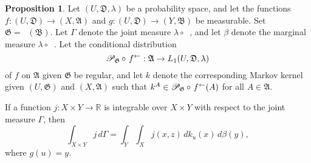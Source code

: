 \documentclass[
twoside=true,
paper=letter,
fontsize=9pt,
pagesize=auto,
leqno,
openany,
headsepline,
overfullrule,
]{scrbook}
\theoremstyle{plain}
\theoremstyle{plain}
\theoremstyle{definition}
\theoremstyle{bfnoteitalic}
\newtheorem{propboldnote}[thm]{Proposition}
\theoremstyle{bfnoteroman}
\newcommand{\sigalg}[1]{\mathfrak{#1}}
\newcommand{\cali}[1]{\mathscr{#1}}
\newcommand{\condprobop}[1]{\mathop{\cali{P}\hspace{-1pt}}\nolimits_{#1}}
\newcommand{\preimage}[1]{\mathop{#1^{\leftarrow}}}
\newcommand{\R}{\mathbb{R}}
\newcommand{\sigmaalgebra}{\sigalg{A}}
\newcommand{\sigmaalgebraii}{\sigalg{B}}
\newcommand{\funcg}{g}
\newcommand{\funcj}{j}
\newcommand{\funck}{k}
\newcommand{\function}{f}
\newcommand{\measurespace}{X}
\newcommand{\measurespaceii}{Y}
\newcommand{\mspaceelt}{x}
\newcommand{\mspaceeltii}{y}
\newcommand{\mspaceeltiii}{z}
\newcommand{\measureiii}{\lambda}
\newcommand{\measlambda}{\lambda}
\newcommand{\seti}{A}
\newcommand{\uspace}{U}%
\newcommand{\uspaceelt}{u}
\newcommand{\uspacesig}{\sigalg{D}}
\newcommand{\measonprod}{\Gamma}%
\newcommand{\marginaltwo}{\beta}%
\begin{document}
\begin{propboldnote}\label{joint_decomposition}
Let
$(\uspace, \uspacesig, \measureiii)$
be a probability space, and let the functions
$\function:(\uspace,\uspacesig)\to (\measurespace,\sigmaalgebra)$
and
$\funcg:(\uspace,\uspacesig)\to (\measurespaceii,\sigmaalgebraii)$
be measurable. Set
$\sigalg{G} = \preimage{\funcg}(\sigmaalgebraii)$.
Let $\measonprod$ denote the joint measure  $\measureiii\circ\preimage{(\function,\funcg)}$,
and let $\marginaltwo$ denote the marginal measure $\measlambda\circ\preimage{\funcg}$.
Let the conditional distribution
\[
\condprobop{\sigalg{G}}\circ\, \preimage{\function}:
\sigmaalgebra \to L_1(\uspace,\uspacesig,\measureiii)
\]
of $\function$ on $\sigmaalgebra$ given $\sigalg{G}$
be regular, and let
$\funck$
denote the corresponding Markov kernel given
$(\uspace,\sigalg{G})$ and $(\measurespace,\sigmaalgebra)$ such that
$\funck^\seti\in
\condprobop{\sigalg{G}}\circ\, \preimage{\function}(\seti)$
for all $\seti\in\sigmaalgebra$.

If a function
$j:\measurespace\times\measurespaceii \to \R$
is integrable over
$\measurespace\times\measurespaceii$
with respect to the joint measure $\measonprod$,
then
\[
\int_{\measurespace\times\measurespaceii} \funcj \,
d \measonprod
=
\int_\measurespaceii\int_\measurespace
\funcj(\mspaceelt,\mspaceeltiii) \,
d \funck_\uspaceelt(\mspaceelt)\,
d \marginaltwo(\mspaceeltii),
\]
where  $\funcg(\uspaceelt) = \mspaceeltii$.
\end{propboldnote}
\end{document}
